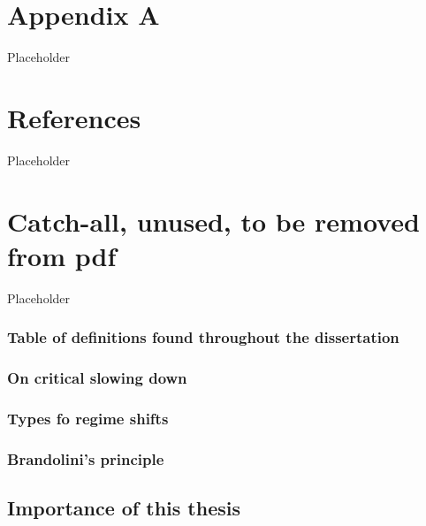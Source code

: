 \documentclass[12pt,twoside]{reedthesis}
\begin{document}
\hypertarget{rRDM}{%
\chapter*{Appendix A}\label{rRDM}}

Placeholder

\hypertarget{references}{%
\chapter*{References}\label{references}}

Placeholder

\hypertarget{catch-all-unused-to-be-removed-from-pdf}{%
\chapter*{Catch-all, unused, to be removed from pdf}\label{catch-all-unused-to-be-removed-from-pdf}}

Placeholder

\hypertarget{table-of-definitions-found-throughout-the-dissertation}{%
\subsection{Table of definitions found throughout the dissertation}\label{table-of-definitions-found-throughout-the-dissertation}}

\hypertarget{on-critical-slowing-down}{%
\subsection{On critical slowing down}\label{on-critical-slowing-down}}

\hypertarget{types-fo-regime-shifts}{%
\subsection{Types fo regime shifts}\label{types-fo-regime-shifts}}

\hypertarget{brandolinis-principle}{%
\subsection{Brandolini's principle}\label{brandolinis-principle}}

\hypertarget{importance-of-this-thesis}{%
\section{Importance of this thesis}\label{importance-of-this-thesis}}
\end{document}
